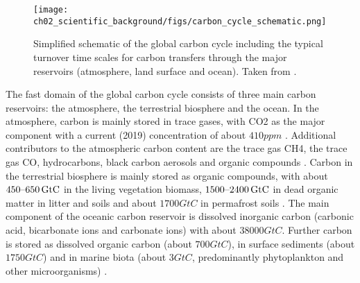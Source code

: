 \begin{figure}[t]
  \centering
  \texttt{[image: 
    ch02\_scientific\_background/figs/carbon\_cycle\_schematic.png]}
  \caption{Simplified schematic of the global carbon cycle including the
    typical turnover time scales for carbon transfers through the major
    reservoirs (atmosphere, land surface and ocean). Taken from
    \textcite{Ciais2013}.}
  \label{fig:02:carbon_cycle_schematic}
\end{figure}

The fast domain of the global carbon cycle consists of three main carbon
reservoirs: the atmosphere, the terrestrial biosphere and the ocean. In the
atmosphere, carbon is mainly stored in trace gases, with \ac{CO2} as the major
component with a current (2019) concentration of about $410 \unit{ppm}$
\autocite{Friedlingstein2019}. Additional contributors to the atmospheric
carbon content are the trace gas \ac{CH4}, the trace gas \ac{CO}, hydrocarbons,
black carbon aerosols and organic compounds \autocite{Ciais2013}. Carbon in the
terrestrial biosphere is mainly stored as organic compounds, with about
$\range{450}{650} \unit{GtC}$ in the living vegetation biomass,
$\range{1500}{2400} \unit{GtC}$ in dead organic matter in litter and soils and
about $1700 \unit{GtC}$ in permafrost soils \autocite{Ciais2013}. The main
component of the oceanic carbon reservoir is dissolved inorganic carbon
(carbonic acid, bicarbonate ions and carbonate ions) with about $38000
\unit{GtC}$. Further carbon is stored as dissolved organic carbon (about $700
\unit{GtC}$), in surface sediments (about $1750 \unit{GtC}$) and in marine
biota (about $3 \unit{GtC}$, predominantly phytoplankton and other
microorganisms) \autocite{Ciais2013, Friedlingstein2019}.

